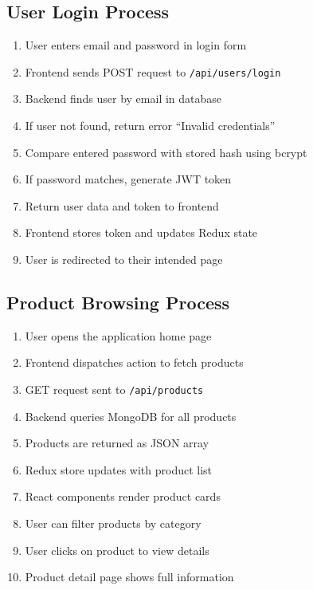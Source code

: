 \documentclass[12pt,a4paper]{article}
\begin{document}
\subsection{User Login Process}

\begin{enumerate}[label=\textbf{Step \arabic*:}]
    \item User enters email and password in login form
    \item Frontend sends POST request to \texttt{/api/users/login}
    \item Backend finds user by email in database
    \item If user not found, return error ``Invalid credentials''
    \item Compare entered password with stored hash using bcrypt
    \item If password matches, generate JWT token
    \item Return user data and token to frontend
    \item Frontend stores token and updates Redux state
    \item User is redirected to their intended page
\end{enumerate}

\subsection{Product Browsing Process}

\begin{enumerate}[label=\textbf{Step \arabic*:}]
    \item User opens the application home page
    \item Frontend dispatches action to fetch products
    \item GET request sent to \texttt{/api/products}
    \item Backend queries MongoDB for all products
    \item Products are returned as JSON array
    \item Redux store updates with product list
    \item React components render product cards
    \item User can filter products by category
    \item User clicks on product to view details
    \item Product detail page shows full information
\end{enumerate}
\end{document}
